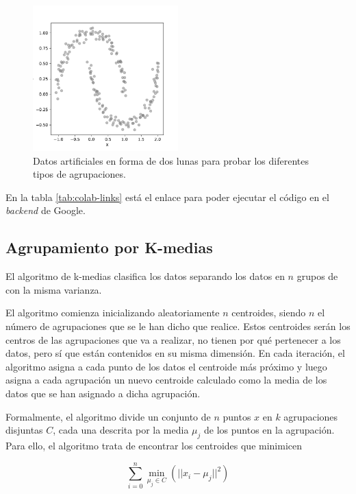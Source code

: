 \begin{figure}[h]
  \centering

  \includegraphics[width=0.5\textwidth]{figures/fake-data.pdf}
  \caption[Datos artificiales]{Datos artificiales en forma de dos lunas para probar los diferentes tipos de agrupaciones.}
  \label{fig:fake-data}

\end{figure}

En la tabla \ref{tab:colab-links} está el enlace para poder ejecutar el código en el \textit{backend} de Google.

\subsection{Agrupamiento por K-medias}
El algoritmo de k-medias clasifica los datos separando los datos en $n$ grupos de con la misma varianza.

El algoritmo comienza inicializando aleatoriamente $n$ centroides, siendo $n$ el número de agrupaciones que se le han dicho que realice. Estos centroides serán los centros de las agrupaciones que va a realizar, no tienen por qué pertenecer a los datos, pero sí que están contenidos en su misma dimensión. En cada iteración, el algoritmo asigna a cada punto de los datos el centroide más próximo y luego asigna a cada agrupación un nuevo centroide calculado como la media de los datos que se han asignado a dicha agrupación.

Formalmente, el algoritmo divide un conjunto de $n$ puntos $x$ en $k$ agrupaciones disjuntas $C$, cada una descrita por la media $\mu_j$ de los puntos en la agrupación. Para ello, el algoritmo trata de encontrar los centroides que minimicen

\begin{equation}
  \sum\limits_{i=0}^n \underset{\mu_j \in C}{\operatorname{min}} (|| x_i - \mu_j||^2)
\end{equation}

